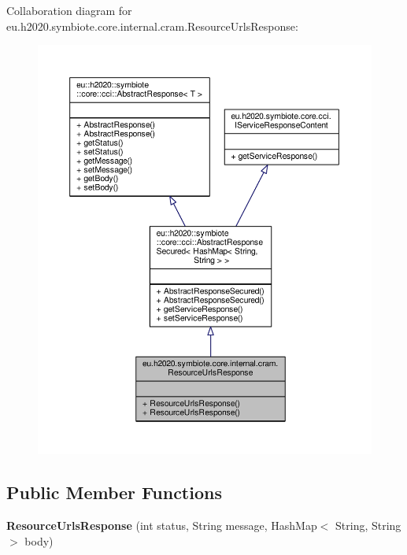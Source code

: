 Collaboration diagram for eu.\+h2020.\+symbiote.\+core.\+internal.\+cram.\+Resource\+Urls\+Response\+:\nopagebreak
\begin{figure}[H]
\begin{center}
\leavevmode
\includegraphics[width=350pt]{classeu_1_1h2020_1_1symbiote_1_1core_1_1internal_1_1cram_1_1ResourceUrlsResponse__coll__graph}
\end{center}
\end{figure}
\subsection*{Public Member Functions}
\begin{DoxyCompactItemize}
\item 
\mbox{\label{classeu_1_1h2020_1_1symbiote_1_1core_1_1internal_1_1cram_1_1ResourceUrlsResponse_a3c313231c2ebbf3e03c8b1b87da10d2f}} 
{\bfseries Resource\+Urls\+Response} (int status, String message, Hash\+Map$<$ String, String $>$ body)
\end{DoxyCompactItemize}


